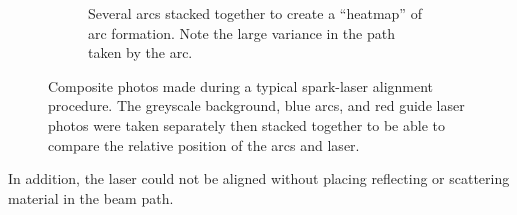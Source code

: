 \begin{figure}[h]
\begin{subfigure}[t]{0.47\textwidth}
                    \caption{Several arcs stacked together to create a ``heatmap'' of arc formation. Note the large variance in the path taken by the arc.}
                    \label{fig:sparkAlignment_heatmap}
                \end{subfigure}
                \caption[Composite photos made during a typical spark-laser alignment procedure]{Composite photos made during a typical spark-laser alignment procedure. The greyscale background, blue arcs, and red guide laser photos were taken separately then stacked together to be able to compare the relative position of the arcs and laser.}
                \label{fig:sparkAlignment}
            \end{figure}

            In addition, the laser could not be aligned without placing reflecting or scattering material in the beam path.